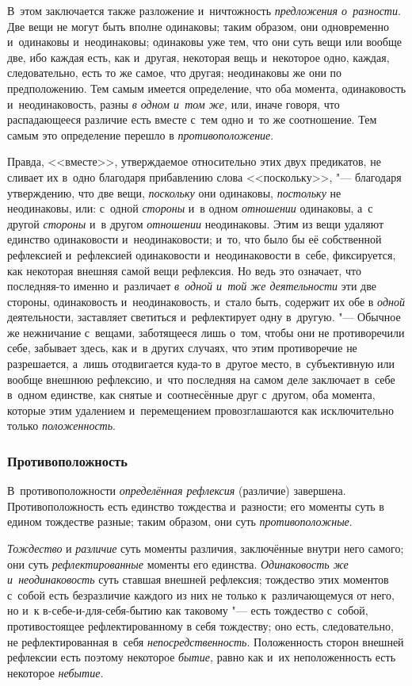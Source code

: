 В~этом заключается также разложение и~ничтожность {\em
предложения о~разности}. Две вещи не могут быть вполне одинаковы; таким
образом, они одновременно и~одинаковы и~неодинаковы; одинаковы уже тем, что
они суть вещи или вообще две, ибо каждая есть, как и~другая, некоторая вещь
и~некоторое одно, каждая, следовательно, есть то же самое, что другая;
неодинаковы же они по предположению. Тем самым имеется определение, что оба
момента, одинаковость и~неодинаковость, разны {\em в
одном и~том же,} или, иначе говоря, что распадающееся различие есть вместе
с~тем одно и~то же соотношение. Тем самым это определение перешло в
{\em противоположение}.

Правда, <<вместе>>, утверждаемое относительно этих двух предикатов, не сливает
их в~одно благодаря прибавлению слова <<поскольку>>, "--- благодаря
утверждению, что две вещи, {\em поскольку} они
одинаковы, {\em постольку} не неодинаковы, или: с~одной
{\em стороны} и~в одном {\em отношении} одинаковы, а~с другой
{\em стороны} и~в другом {\em отношении} неодинаковы. Этим из вещи удаляют
единство одинаковости и~неодинаковости; и~то, что было бы её собственной
рефлексией и~рефлексией одинаковости и~неодинаковости в~себе, фиксируется,
как некоторая внешняя самой вещи рефлексия. Но ведь это означает, что
последняя-то именно и~различает {\em в~одной и~той же
деятельности} эти две стороны, одинаковость и~неодинаковость, и~стало быть,
содержит их обе в {\em одной} деятельности, заставляет
светиться и~рефлектирует одну в~другую. "--- Обычное же нежничание с~вещами,
заботящееся лишь о~том, чтобы они не противоречили себе, забывает здесь,
как и~в других случаях, что этим противоречие не разрешается, а~лишь
отодвигается куда-то в~другое место, в~субъективную или вообще внешнюю
рефлексию, и~что последняя на самом деле заключает в~себе в~одном единстве,
как снятые и~соотнесённые друг с~другом, оба момента, которые этим
удалением и~перемещением провозглашаются как исключительно только
{\em положенность}.


\subsubsection{Противоположность}
В~противоположности {\em определённая рефлексия} (различие) завершена.
Противоположность есть единство тождества и~разности; его моменты суть в
едином тождестве разные; таким образом, они суть {\em противоположные}.

{\em Тождество} и {\em различие}
суть моменты различия, заключённые внутри него самого; они суть
{\em рефлектированные} моменты его единства.
{\em Одинаковость же и~неодинаковость} суть ставшая
внешней рефлексия; тождество этих моментов с~собой есть безразличие каждого
из них не только к~различающемуся от него, но и~к в-себе-и-для-себя-бытию
как таковому "--- есть тождество с~собой, противостоящее рефлектированному в
себя тождеству; оно есть, следовательно, не рефлектированная в~себя
{\em непосредственность}. Положенность сторон внешней
рефлексии есть поэтому некоторое {\em бытие,} равно как
и~их неположенность есть некоторое {\em небытие}.

